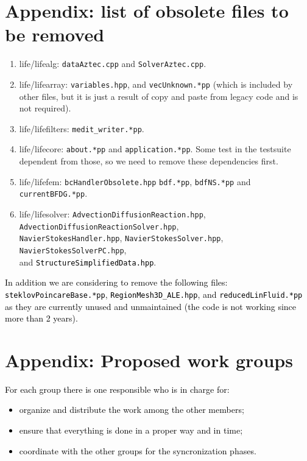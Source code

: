 \documentclass[10p]{article}
\newcommand{\newparts}[1]{\textcolor{black}{#1}}
\theoremstyle{definition}
\begin{document}
\newpage
\section*{Appendix: list of obsolete files to be removed}
\begin{enumerate}
\item life/lifealg: \texttt{dataAztec.cpp} and \texttt{SolverAztec.cpp}.
\item life/lifearray: \texttt{variables.hpp}, and \texttt{vecUnknown.*pp} (which is included by other files, but it is just a result of copy and paste from legacy code and is not required).
\item life/lifefilters: \texttt{medit\_writer.*pp}.
\item life/lifecore: \texttt{about.*pp} and \texttt{application.*pp}. Some test in the testsuite dependent from those, so we need to remove these dependencies first.
\item life/lifefem: \texttt{bcHandlerObsolete.hpp} \texttt{bdf.*pp}, \texttt{bdfNS.*pp} and \texttt{currentBFDG.*pp}.
\item life/lifesolver: \texttt{AdvectionDiffusionReaction.hpp}, \texttt{AdvectionDiffusionReactionSolver.hpp}, \\ 
\texttt{NavierStokesHandler.hpp}, \texttt{NavierStokesSolver.hpp}, \texttt{NavierStokesSolverPC.hpp},\\ 
and \newparts{\texttt{StructureSimplifiedData.hpp}}.
\end{enumerate}

\newparts{In addition we are considering to remove the following files: \texttt{steklovPoincareBase.*pp}, \texttt{RegionMesh3D\_ALE.hpp}, and \texttt{reducedLinFluid.*pp} as they are currently unused and unmaintained (the code is not working since more than 2 years).}



\section*{Appendix: Proposed work groups}

\newparts{For each group there is one responsible who is in charge for:
\begin{itemize}
  \item organize and distribute the work among the other members;
  \item ensure that everything is done in a proper way and in time;
  \item coordinate with the other groups for the syncronization phases. 
\end{itemize}
}
\end{document}
